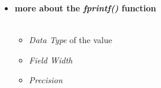 \documentclass[11pt]{article}
\begin{document}
\begin{itemize}
\begin{itemize}
\begin{itemize}
            	\end{itemize}
            	\newpage
            	\item \textbf{ \Large more about the \LARGE{\it fprintf()} \Large function} \vspace{10mm} \\
            	 \vspace{5mm} \\
            \vspace{5mm}
            		\LARGE
			\begin{itemize}
				\item {\it Data Type} of the value \vspace{40mm} \\
				\item {\it Field Width} \vspace{40mm} \\
				\item {\it Precision}\vspace{40mm} \\
			\end{itemize}
	

\end{itemize}
\end{itemize}
\end{document}
